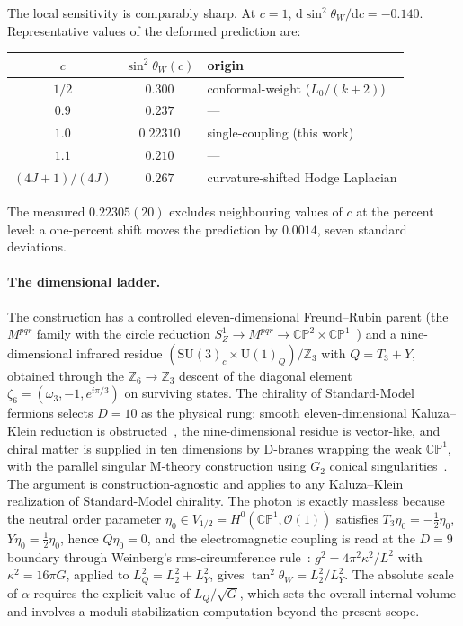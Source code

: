 \documentclass[aps,prl,twocolumn,superscriptaddress,floatfix,nofootinbib,reprint]{revtex4-2}
\newcommand{\half}{\tfrac12}
\newcommand{\sinsq}{\sin^{2}\!\theta_{W}}
\newcommand{\cO}{\mathcal{O}}
\newcommand{\SU}{\mathrm{SU}}
\newcommand{\U}{\mathrm{U}}
\newcommand{\CP}{\mathbb{CP}}
\newcommand{\dd}{\mathrm{d}}
\begin{document}
The local sensitivity is comparably sharp.  At $c=1$,
$\dd\sinsq/\dd c=-0.140$.  Representative values of the deformed
prediction are:
\begin{center}
\begin{tabular}{c|c|l}
\hline
$c$ & $\sinsq(c)$ & origin\\
\hline
$1/2$ & $0.300$ & conformal-weight ($L_{0}/(k+2)$)\\
$0.9$ & $0.237$ & --- \\
$1.0$ & $0.22310$ & single-coupling (this work)\\
$1.1$ & $0.210$ & --- \\
$(4J+1)/(4J)$ & $0.267$ & curvature-shifted Hodge Laplacian\\
\hline
\end{tabular}
\end{center}
The measured $0.22305(20)$ excludes neighbouring values of $c$ at the
percent level: a one-percent shift moves the prediction by $0.0014$,
seven standard deviations.


\paragraph{The dimensional ladder.}
The construction has a controlled eleven-dimensional Freund--Rubin
parent (the $M^{pqr}$ family with the circle reduction $S^{1}_{Z}\to
M^{pqr}\to\CP^{2}\times\CP^{1}$~\cite{BailinLove1984,DuffNilssonPope1986})
and a nine-dimensional infrared residue
$(\SU(3)_{c}\times\U(1)_{Q})/\mathbb{Z}_{3}$ with $Q=T_{3}+Y$, obtained
through the $\mathbb{Z}_{6}\to\mathbb{Z}_{3}$ descent of the diagonal
element $\zeta_{6}=(\omega_{3},-1,e^{i\pi/3})$ on surviving states.
The chirality of Standard-Model fermions selects $D=10$ as the
physical rung: smooth eleven-dimensional Kaluza--Klein reduction is
obstructed~\cite{Witten1981}, the nine-dimensional residue is
vector-like, and chiral matter is supplied in ten dimensions by
D-branes wrapping the weak $\CP^{1}$, with the parallel singular
M-theory construction using $G_{2}$ conical
singularities~\cite{AcharyaWitten2001}.  The argument is
construction-agnostic and applies to any Kaluza--Klein realization of
Standard-Model chirality.  The photon is exactly massless because the
neutral order parameter
$\eta_{0}\in V_{1/2}=H^{0}(\CP^{1},\cO(1))$ satisfies
$T_{3}\eta_{0}=-\half\eta_{0}$, $Y\eta_{0}=\half\eta_{0}$, hence
$Q\eta_{0}=0$, and the electromagnetic coupling is read at the $D=9$
boundary through Weinberg's rms-circumference
rule~\cite{Weinberg1983}: $g^{2}=4\pi^{2}\kappa^{2}/L^{2}$ with
$\kappa^{2}=16\pi G$, applied to $L_{Q}^{2}=L_{2}^{2}+L_{Y}^{2}$,
gives $\tan^{2}\theta_{W}=L_{2}^{2}/L_{Y}^{2}$.  The absolute scale of
$\alpha$ requires the explicit value
of $L_{Q}/\sqrt{G}$, which sets the overall internal volume and
involves a moduli-stabilization computation beyond the present scope.
\end{document}
